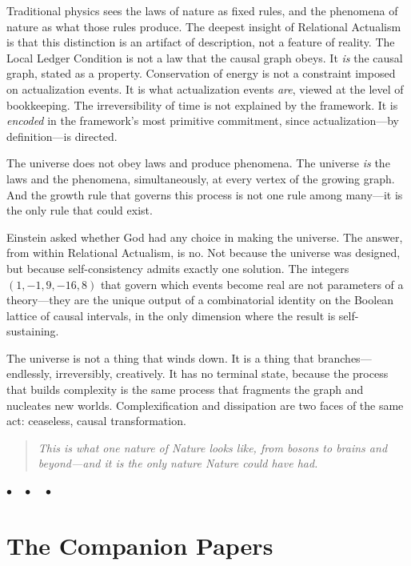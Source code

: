 \documentclass[12pt,a4paper]{article}
\begin{document}
Traditional physics sees the laws of nature as fixed rules, and the phenomena of nature as what those rules produce. The deepest insight of Relational Actualism is that this distinction is an artifact of description, not a feature of reality. The Local Ledger Condition is not a law that the causal graph obeys. It \emph{is} the causal graph, stated as a property. Conservation of energy is not a constraint imposed on actualization events. It is what actualization events \emph{are}, viewed at the level of bookkeeping. The irreversibility of time is not explained by the framework. It is \emph{encoded} in the framework's most primitive commitment, since actualization---by definition---is directed.

The universe does not obey laws and produce phenomena. The universe \emph{is} the laws and the phenomena, simultaneously, at every vertex of the growing graph. And the growth rule that governs this process is not one rule among many---it is the only rule that could exist.

Einstein asked whether God had any choice in making the universe. The answer, from within Relational Actualism, is no. Not because the universe was designed, but because self-consistency admits exactly one solution. The integers $(1, -1, 9, -16, 8)$ that govern which events become real are not parameters of a theory---they are the unique output of a combinatorial identity on the Boolean lattice of causal intervals, in the only dimension where the result is self-sustaining.

The universe is not a thing that winds down. It is a thing that branches---endlessly, irreversibly, creatively. It has no terminal state, because the process that builds complexity is the same process that fragments the graph and nucleates new worlds. Complexification and dissipation are two faces of the same act: ceaseless, causal transformation.

\begin{quote}\itshape
This is what one nature of Nature looks like, from bosons to brains and beyond---and it is the only nature Nature could have had.
\end{quote}

\bigskip\begin{center}$\bullet\quad\bullet\quad\bullet$\end{center}\bigskip

\section*{The Companion Papers}
\end{document}
